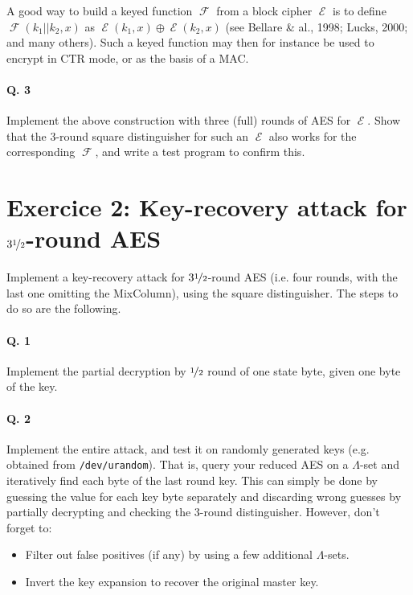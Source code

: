 \documentclass[a4paper,11pt]{article}
\DeclareMathOperator\prf{\mathcal{F}}
\DeclareMathOperator\prp{\mathcal{E}}
\begin{document}
\bigskip

A good way to build a keyed function $\prf$ from a block cipher $\prp$ is to define $\prf(k_1||k_2, x)$ as $\prp(k_1, x) \oplus \prp(k_2, x)$
(see Bellare \& al., 1998; Lucks, 2000; and many others).
Such a keyed function may then for instance be used to encrypt in CTR mode, or as the basis of a MAC.

\smallskip

\paragraph*{Q. 3} Implement the above construction with three (full) rounds of AES for $\prp$. Show that the 3-round square distinguisher
for such an $\prp$ also works for the corresponding $\prf$, and write a test program to confirm this. 

\section*{Exercice 2: Key-recovery attack for $3\nicefrac{1}{2}$-round AES}

Implement a key-recovery attack for $3\nicefrac{1}{2}$-round AES (i.e. four rounds, with the last one omitting the MixColumn), using the square distinguisher.
The steps to do so are the following.

\paragraph*{Q. 1} Implement the partial decryption by $\nicefrac{1}{2}$ round of one state byte, given one byte of the key.

\paragraph*{Q. 2} Implement the entire attack, and test it on randomly generated keys (e.g. obtained from \texttt{/dev/urandom}). That is, query
your reduced AES on a $\Lambda$-set and iteratively find each byte of the last round key. This can simply be done by guessing the value for each key
byte separately and discarding wrong guesses by partially decrypting and checking the 3-round distinguisher. However, don't forget to:
\begin{itemize}
\item Filter out false positives (if any) by using a few additional $\Lambda$-sets.
\item Invert the key expansion to recover the original master key.
\end{itemize} 
\end{document}
